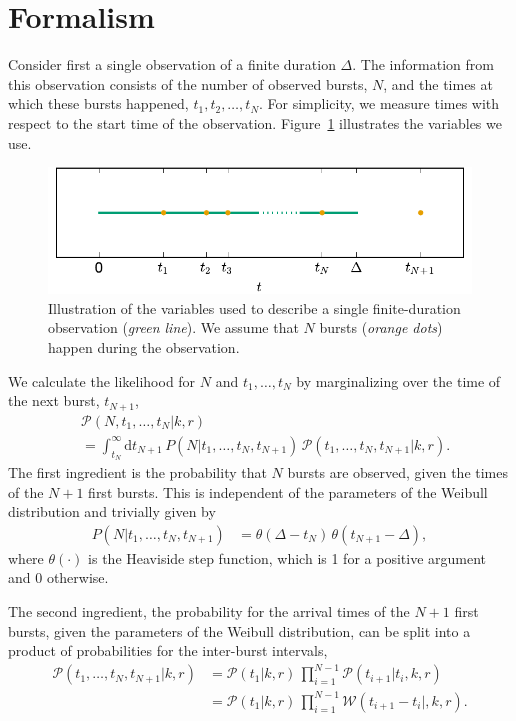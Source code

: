 \documentclass[fleqn,usenatbib]{mnras}
\newcommand{\new}[1]{#1}
\begin{document}
\section{Formalism}
\label{sec:formalism}

Consider first a single observation of a finite duration $\Delta$. The information from this observation consists of the number of observed bursts, $N$, and the times at which these bursts happened, $t_1, t_2,\dots, t_N$. For simplicity, we measure times with respect to the start time of the observation. Figure~\ref{fig:singleinterval} illustrates the variables we use.

\begin{figure}
	\includegraphics[width=\columnwidth]{singleinterval.pdf}
	\caption{\label{fig:singleinterval}Illustration of the variables used to describe a single finite-duration observation (\emph{green line}). We assume that $N$ bursts (\emph{orange dots}) happen during the observation.}
\end{figure}

We calculate the likelihood for $N$ and $t_1,\dots,t_N$ by marginalizing over the time of the next burst, $t_{N+1}$,
\begin{align}
	\label{eq:likelihood_firstsplit}
	&\mathcal{P}(N,t_1,\dots,t_N|k,r)\nonumber\\
	&= \int_{t_N}^\infty \mathrm{d}t_{N+1} \, P(N|t_1,\dots,t_N,t_{N+1}) \, \mathcal{P}(t_1,\dots,t_N,t_{N+1}|k,r).
\end{align}
The first ingredient is the probability that $N$ bursts are observed, given the times of the $N+1$ first bursts. This is independent of the parameters of the Weibull distribution and trivially given by
\begin{align}
	P(N|t_1,\dots,t_N,t_{N+1}) &= \theta(\Delta - t_N) \, \theta(t_{N+1} - \Delta),
\end{align}
where $\theta(\cdot)$ is the Heaviside step function, which is 1 for a positive argument and 0 otherwise.

The second ingredient, the probability for \new{the arrival times of the $N+1$ first bursts}, given the parameters of the Weibull distribution, can be split into a product of probabilities for the inter-burst intervals,
\begin{align}
	\label{eq:likelihood_times}
	\mathcal{P}(t_1,\dots,t_N,t_{N+1}|k,r) & = \mathcal{P}(t_1|k,r) \, \prod_{i = 1}^{N - 1} \mathcal{P}(t_{i+1}|t_{i},k,r)\nonumber\\
	&= \mathcal{P}(t_1|k,r) \, \prod_{i = 1}^{N - 1} \mathcal{W}(t_{i+1} - t_i|,k,r).
\end{align}
\end{document}
